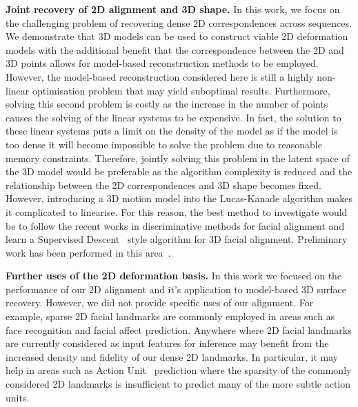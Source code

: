 \textbf{Joint recovery of 2D alignment and 3D shape.}
In this work, we focus on the challenging problem of recovering dense 2D
correspondences across sequences. We demonstrate that 3D models can be used
to construct viable 2D deformation models with the additional benefit that the
correspondence between the 2D and 3D points allows for model-based
reconstruction methods to be employed. However, the model-based reconstruction
considered here is still a highly non-linear optimisation problem that may
yield suboptimal results. Furthermore, solving this second problem is costly
as the increase in the number of points causes the solving of the linear
systems to be expensive. In fact, the solution to these linear systems puts a
limit on the density of the model as if the model is too dense it will become
impossible to solve the problem due to reasonable memory constraints. Therefore,
jointly solving this problem in the latent space of the 3D model would be
preferable as the algorithm complexity is reduced and the relationship between the
2D correspondences and 3D shape becomes fixed. However, introducing a 3D
motion model into the Lucas-Kanade algorithm makes it complicated to linearise.
For this reason, the best method to investigate would be to follow the recent
works in discriminative methods for facial alignment and learn a
Supervised Descent~\cite{xiong2013supervised} style algorithm for 3D facial
alignment. Preliminary work has been performed in this
area~\cite{thies2016face,Jourabloo:2015dw,Huber:2015bs,Jeni:2015ft,jo2015single}.

\textbf{Further uses of the 2D deformation basis.} In this work we focused
on the performance of our 2D alignment and it's application to model-based 3D
surface recovery. However, we did not provide specific uses of our alignment.
For example, sparse 2D facial landmarks are commonly employed in areas such as
face recognition and facial affect prediction. Anywhere where 2D facial landmarks
are currently considered as input features for inference may benefit from
the increased density and fidelity of our dense 2D landmarks. In particular,
it may help in areas such as Action Unit~\cite{ekman1977facial} prediction
where the sparsity of the commonly considered 2D landmarks is insufficient
to predict many of the more subtle action units.
